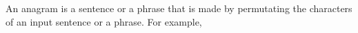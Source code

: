 An anagram is a sentence or a phrase that is made by permutating the characters of an input sentence or a phrase. For example,